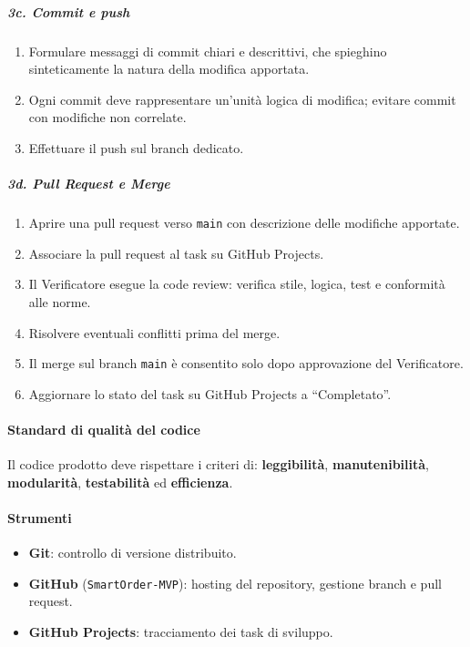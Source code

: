 \documentclass[a4paper, 11pt, oneside]{scrartcl}
\begin{document}
\subparagraph{3c. Commit e push}
\begin{enumerate}
    \item Formulare messaggi di commit{\scriptsize{}} chiari e descrittivi, che spieghino sinteticamente la natura della modifica apportata.
    \item Ogni commit deve rappresentare un'unità logica di modifica; evitare commit con modifiche non correlate.
    \item Effettuare il push sul branch dedicato.
\end{enumerate}

\subparagraph{3d. Pull Request e Merge}
\begin{enumerate}
    \item Aprire una pull request{\scriptsize{}} verso \texttt{main} con descrizione delle modifiche apportate.
    \item Associare la pull request al task su GitHub Projects.
    \item Il Verificatore esegue la code review: verifica stile, logica, test e conformità alle norme.
    \item Risolvere eventuali conflitti prima del merge.
    \item Il merge sul branch \texttt{main} è consentito solo dopo approvazione del Verificatore.
    \item Aggiornare lo stato del task su GitHub Projects a ``Completato''.
\end{enumerate}

\paragraph{Standard di qualità del codice}
Il codice prodotto deve rispettare i criteri di: \textbf{leggibilità}, \textbf{manutenibilità}, \textbf{modularità}, \textbf{testabilità} ed \textbf{efficienza}.

\paragraph{Strumenti}
\begin{itemize}
    \item \textbf{Git}: controllo di versione distribuito.
    \item \textbf{GitHub} (\texttt{SmartOrder-MVP}): hosting del repository, gestione branch e pull request.
    \item \textbf{GitHub Projects}: tracciamento dei task di sviluppo.
\end{itemize}
\end{document}
